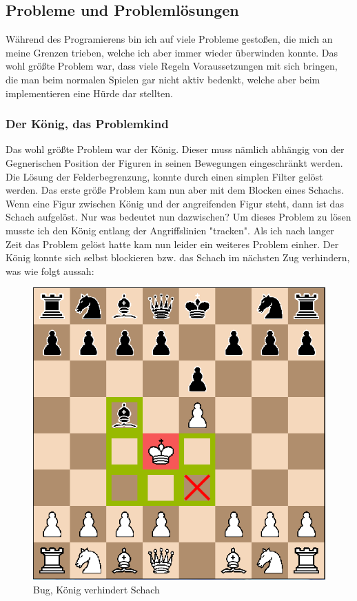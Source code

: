 \documentclass[a4paper, 10pt]{scrartcl}
\begin{document}
\subsection{Probleme und Problemlösungen}
Während des Programierens bin ich auf viele Probleme gestoßen, die mich an meine Grenzen trieben, welche ich aber immer wieder überwinden konnte.
Das wohl größte Problem war, dass viele Regeln Voraussetzungen mit sich bringen, die man beim normalen Spielen gar nicht aktiv bedenkt, welche aber
beim implementieren eine Hürde dar stellten.

\subsubsection{Der König, das Problemkind}
Das wohl größte Problem war der König. Dieser muss nämlich abhängig von der Gegnerischen Position der Figuren
in seinen Bewegungen eingeschränkt werden. Die Lösung der Felderbegrenzung, konnte durch einen simplen Filter gelöst werden. Das erste größe Problem kam nun aber mit dem
Blocken eines Schachs. Wenn eine Figur zwischen König und der angreifenden Figur steht, dann ist das Schach aufgelöst. Nur was bedeutet nun dazwischen?
Um dieses Problem zu lösen musste ich den König entlang der Angriffslinien "tracken". Als ich nach langer Zeit das Problem gelöst hatte kam nun leider ein weiteres Problem einher. 
Der König konnte sich selbst blockieren bzw. das Schach im nächsten Zug verhindern, was wie folgt aussah: 
\begin{figure}[h]
\centering
\includegraphics[scale=0.6]{assets/Bug_king_blocking.png}
\caption{Bug, König verhindert Schach}
\end{figure}
\end{document}
